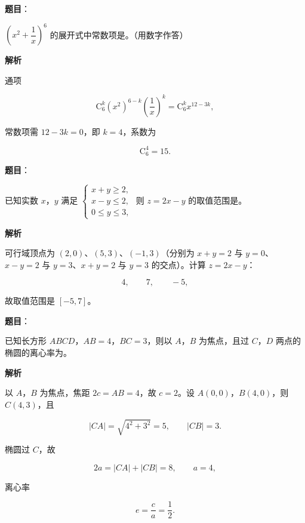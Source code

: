 \begin{answer}

\textbf{题目}：

$\left(x^2+\dfrac1x\right)^6$ 的展开式中常数项是\gkblank{}。（用数字作答）

\textbf{解析}

通项

\nopagebreak[4]
\[\mathrm C_6^k\left(x^2\right)^{6-k}\left(\frac1x\right)^k=\mathrm C_6^k x^{12-3k},\]

常数项需 $12-3k=0$，即 $k=4$，系数为

\nopagebreak[4]
\[\mathrm C_6^4=15.\]


\end{answer}
\begin{answer}

\textbf{题目}：

已知实数 $x$，$y$ 满足 $\begin{cases}x+y\geqslant2,\\ x-y\leqslant2,\\ 0\leqslant y\leqslant3,\end{cases}$ 则 $z=2x-y$ 的取值范围是\gkblank{}。

\textbf{解析}

可行域顶点为 $(2,0)$、$(5,3)$、$(-1,3)$（分别为 $x+y=2$ 与 $y=0$、$x-y=2$ 与 $y=3$、$x+y=2$ 与 $y=3$ 的交点）。计算 $z=2x-y$：

\nopagebreak[4]
\[4,\qquad 7,\qquad -5,\]

故取值范围是 $[-5,7]$。


\end{answer}
\begin{answer}

\textbf{题目}：

已知长方形 $ABCD$，$AB=4$，$BC=3$，则以 $A$，$B$ 为焦点，且过 $C$，$D$ 两点的椭圆的离心率为\gkblank{}。

\textbf{解析}

以 $A$，$B$ 为焦点，焦距 $2c=AB=4$，故 $c=2$。设 $A(0,0)$，$B(4,0)$，则 $C(4,3)$，且

\nopagebreak[4]
\[|CA|=\sqrt{4^2+3^2}=5,\qquad |CB|=3.\]

椭圆过 $C$，故

\nopagebreak[4]
\[2a=|CA|+|CB|=8,\qquad a=4,\]

离心率

\nopagebreak[4]
\[e=\frac ca=\frac12.\]


\end{answer}

